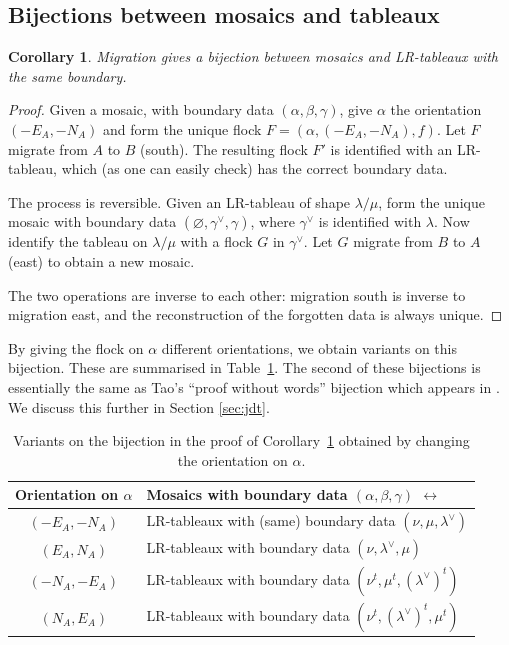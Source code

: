 \documentclass[12pt]{article}
\newtheorem{corollary}[lemma]{Corollary}
\begin{document}
\subsection{Bijections between mosaics and tableaux}
\begin{corollary}
\label{cor:mosaictableau}
Migration gives a bijection between mosaics and LR-tableaux with
the same boundary.
\end{corollary}

\begin{proof}
Given a mosaic, with boundary
data $(\alpha, \beta, \gamma)$, give $\alpha$ the orientation
$(-E_A, -N_A)$
and form the unique flock $F = (\alpha, (-E_A,-N_A), f)$.  Let $F$
migrate from $A$ to $B$ (south).
The resulting flock $F'$ is identified with an LR-tableau, which 
(as one can easily check) has the correct boundary data.

The process is reversible.  Given an LR-tableau of shape $\lambda/\mu$,
form the unique mosaic with boundary data 
$(\varnothing, \gamma^\vee, \gamma)$, where
$\gamma^\vee$ is identified with $\lambda$.
Now identify the tableau on $\lambda/\mu$ with a flock $G$
in $\gamma^\vee$.  Let $G$ migrate from $B$ to $A$ (east) to obtain 
a new mosaic.

The two operations are inverse to each other:  migration south is
inverse to migration east, and the reconstruction of the forgotten
data is always unique.
\end{proof}

By giving the flock on $\alpha$ different orientations, we obtain
variants on this bijection.  These are summarised in 
Table~\ref{tbl:variants}.
The second of these bijections is essentially the same as Tao's 
``proof without words'' bijection which appears in \cite{vakil}.  
We discuss this further in Section \ref{sec:jdt}.

%
\begin{table}[htbp]

\begin{center}
\begin{tabular}{|c|l|}
\hline
Orientation on $\alpha$ & 
Mosaics with boundary data $(\alpha,\beta,\gamma)$ $\leftrightarrow$
\\ \hline \hline
$(-E_A, -N_A)$ & 
LR-tableaux with (same) boundary data $(\nu, \mu, \lambda^\vee)$
\\ \hline
$(E_A, N_A)$ & 
LR-tableaux with boundary data $(\nu, \lambda^\vee, \mu)$
\\ \hline
$(-N_A, -E_A)$ & 
LR-tableaux with  boundary data $(\nu^t, \mu^t, (\lambda^\vee)^t)$
\\ \hline
$(N_A, E_A)$ & LR-tableaux with boundary data $(\nu^t, (\lambda^\vee)^t, \mu^t)$
\\ \hline
\end{tabular}
\end{center}
\caption{Variants on the bijection in the proof 
of Corollary~\ref{cor:mosaictableau}
obtained by changing the orientation on $\alpha$.}
\label{tbl:variants}
\end{table}
%
\end{document}
